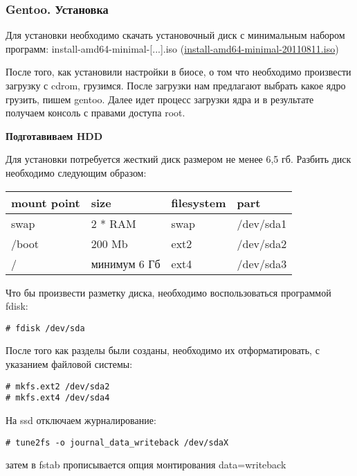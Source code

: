 \documentclass[12pt, a6paper]{article}
\begin{document}
\subsubsection{Gentoo. Установка}

Для установки необходимо скачать установочный диск с минимальным набором программ: 
install-amd64-minimal-[...].iso
(\href{http://mirror.yandex.ru/gentoo-distfiles/releases/amd64/current-iso/install-amd64-minimal-20110811.iso}{install-amd64-minimal-20110811.iso})

После того, как установили настройки в биосе, о том что необходимо произвести загрузку с cdrom, грузимся. После загрузки нам предлагают выбрать какое ядро грузить, пишем gentoo. Далее идет процесс загрузки ядра и в результате получаем консоль с правами доступа root.


{\bf Подготавиваем HDD}

Для установки потребуется жесткий диск размером не менее 6,5 гб. Разбить диск необходимо следующим образом:

\begin{center}
\tt{
\begin{tabular}{|l|l|l|l|}
\hline mount point & size & filesystem & part \\
\hline swap  & 2 * RAM & swap & /dev/sda1 \\
\hline /boot & 200 Mb & ext2  & /dev/sda2 \\
\hline / & минимум 6 Гб & ext4 & /dev/sda3 \\
\hline
\end{tabular}
}
\end{center}

Что бы произвести разметку диска, необходимо воспользоваться программой fdisk:

\begin{verbatim}
# fdisk /dev/sda
\end{verbatim}

После того как разделы были созданы, необходимо их отформатировать, с указанием файловой системы:

\begin{verbatim}
# mkfs.ext2 /dev/sda2
# mkfs.ext4 /dev/sda4
\end{verbatim}

На ssd отключаем журналирование:
\begin{verbatim}
# tune2fs -o journal_data_writeback /dev/sdaX 
\end{verbatim}
затем в fstab прописывается опция монтирования data=writeback
\end{document}
